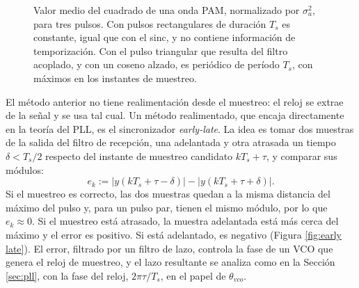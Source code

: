 \begin{figure}
    \begin{center}
    \end{center}
    \caption{Valor medio del cuadrado de una onda PAM, normalizado por $\sigma_a^2$, para tres pulsos. Con pulsos rectangulares de duración $T_s$ es constante, igual que con el sinc, y no contiene información de temporización. Con el pulso triangular que resulta del filtro acoplado, y con un coseno alzado, es periódico de período $T_s$, con máximos en los instantes de muestreo.}\label{fig:media cuadrado}
\end{figure}

El método anterior no tiene realimentación desde el muestreo: el reloj se extrae de la señal y se usa tal cual. Un método realimentado, que encaja directamente en la teoría del PLL, es el sincronizador \emph{early-late}. La idea es tomar dos muestras de la salida del filtro de recepción, una adelantada y otra atrasada un tiempo $\delta<T_s/2$ respecto del instante de muestreo candidato $kT_s+\tau$, y comparar sus módulos:
\begin{equation*}
    e_k := \big|y(kT_s+\tau-\delta)\big| - \big|y(kT_s+\tau+\delta)\big|.
\end{equation*}
Si el muestreo es correcto, las dos muestras quedan a la misma distancia del máximo del pulso y, para un pulso par, tienen el mismo módulo, por lo que $e_k\approx 0$. Si el muestreo está atrasado, la muestra adelantada está más cerca del máximo y el error es positivo. Si está adelantado, es negativo (Figura \ref{fig:early late}). El error, filtrado por un filtro de lazo, controla la fase de un VCO que genera el reloj de muestreo, y el lazo resultante se analiza como en la Sección \ref{sec:pll}, con la fase del reloj, $2\pi\tau/T_s$, en el papel de $\theta_{vco}$.

